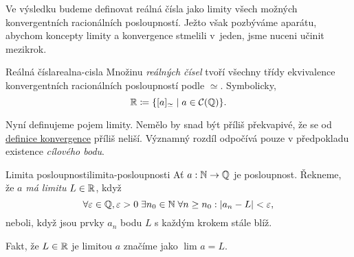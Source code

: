 Ve výsledku budeme definovat reálná čísla jako limity všech možných
konvergentních racionálních posloupností. Ježto však pozbýváme aparátu, abychom
koncepty limity a konvergence stmelili v~jeden, jsme nuceni učinit mezikrok.

\begin{definition}{Reálná čísla}{realna-cisla}
 Množinu \emph{reálných čísel} tvoří všechny třídy ekvivalence konvergentních
 racionálních posloupností podle $ \simeq $. Symbolicky,
 \[
  \mathbb{R} \coloneqq \{[a]_{ \simeq } \mid a \in \mathcal{C}(\mathbb{Q})\}.
 \]
\end{definition}

Nyní definujeme pojem limity. Nemělo by snad být příliš překvapivé, že se od
\hyperref[def:konvergentni-posloupnost]{definice konvergence} příliš neliší.
Významný rozdíl odpočívá pouze v předpokladu existence \emph{cílového bodu}.

\begin{definition}{Limita posloupnosti}{limita-posloupnosti}
 Ať $a:\mathbb{N} \to \mathbb{Q}$ je posloupnost. Řekneme, že $a$ \emph{má limitu} $L \in \mathbb{R}$,
 když
 \[
  \forall \varepsilon \in \mathbb{Q},\varepsilon>0 \; \exists n_0 \in \mathbb{N} \; \forall n
  \geq n_0: |a_n - L|<\varepsilon,
 \]
 neboli, když jsou prvky $a_n$ bodu $L$ s každým krokem stále blíž.

 Fakt, že $L \in \mathbb{R}$ je limitou $a$ značíme jako $\lim_{} a = L$.
\end{definition}
